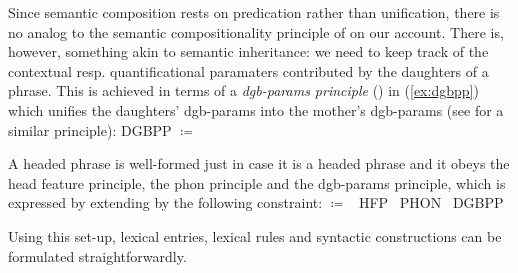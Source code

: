 \documentclass[output=paper]{langsci/langscibook}
\begin{document}
{Since  semantic composition rests on predication rather than unification, there is no analog to the semantic compositionality principle of \citet{Sag:Wasow:Bender:2003} on our account.
%
There is, however, something akin to semantic inheritance: we need to keep track of the contextual resp. quantificational paramaters contributed by the daughters of a phrase. 
%
This is achieved in terms of a \emph{dgb-params principle} () in (\ref{ex:dgbpp}) which unifies the daughters' dgb-params into the mother's dgb-params  (see \citet[126 \textit{et seq.}]{Ginzburg:2012}  for a similar principle): 
%
\ea \label{ex:dgbpp}
DGBPP $\coloneqq$ \label{ex:QPP} \par\medskip
{}
\z

A headed phrase is well-formed just in case it is a headed phrase and it obeys the head feature principle, the phon principle and the dgb-params principle, which is expressed by extending  by the following constraint:
%
\ea \label{ex:hd-phrase}
 $\coloneqq$ 
 \ttrmerge\ {HFP} \ttrmerge\  {PHON} \ttrmerge\ {DGBPP}
\z


Using this set-up, lexical entries, lexical rules and syntactic constructions can be formulated straightforwardly. 
 


}%

{\sloppy
  \printbibliography[heading=subbibliography,notkeyword=this] 
}
\end{document}
